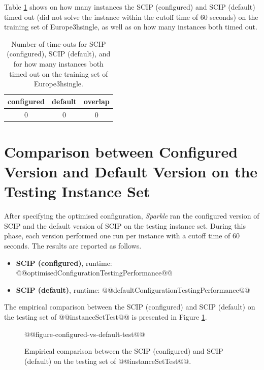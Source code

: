\documentclass[british]{article}
\newif\iftest
\newif\ifruntime
\begin{document}

Table \ref{tbl:timeouts_train} shows on how many instances the SCIP (configured) and SCIP (default) timed out (did not solve the instance within the cutoff time of 60 seconds) on the training set of Europe\textunderscore 3h\textunderscore single, as well as on how many instances both timed out.

    \begin{table}[htbp]
        \centering
            \begin{tabular}{ccc}
                configured & default & overlap \\ \hline
                0 & 0 & 0
            \end{tabular}
            \caption{Number of time-outs for SCIP (configured), SCIP (default), and for how many instances both timed out on the training set of Europe\textunderscore 3h\textunderscore single.}
        \label{tbl:timeouts_train}
    \end{table}


\iftest
    \section{Comparison between Configured Version and Default Version on the Testing Instance Set}

    After specifying the optimised configuration, \emph{Sparkle} ran the configured version of SCIP and the default version of SCIP on the testing instance set. During this phase, each version performed one run per instance with a cutoff time of 60 seconds. The results are reported as follows.

    \begin{itemize}
        \item \textbf{SCIP (configured)}, runtime: @@optimisedConfigurationTestingPerformance@@
        \item \textbf{SCIP (default)}, runtime: @@defaultConfigurationTestingPerformance@@
    \end{itemize}

    The empirical comparison between the SCIP (configured) and SCIP (default) on the testing set of @@instanceSetTest@@ is presented in Figure \ref{fig:configured_vs_default_test}.

    \begin{figure}[htbp]
        \noindent
        \begin{centering}
            @@figure-configured-vs-default-test@@
            \par
        \end{centering}

       \caption{Empirical comparison between the SCIP (configured) and SCIP (default) on the testing set of @@instanceSetTest@@.}\label{fig:configured_vs_default_test}
    \end{figure}
\end{document}
